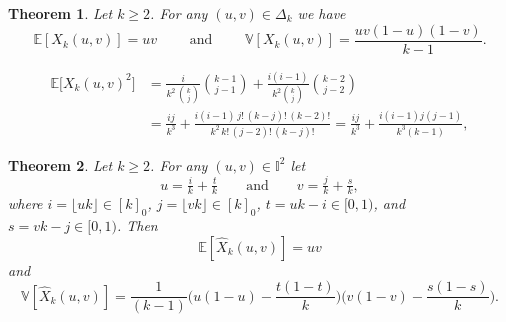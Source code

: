 \documentclass[10pt,a4paper]{amsart}
\newtheorem{theorem}{Theorem}
\newcommand{\DK}{\Delta_k}
\newcommand{\EE}{\mathbb{E}}
\newcommand{\II}{\mathbb{I}}
\newcommand{\VV}{\mathbb{V}}
\newcommand{\Xhat}{\widehat{X}}
\begin{document}
\begin{theorem} \label{th:exk}
    Let $k\ge 2$. For any $(u,v) \in \DK$ we have 
    $$ \EE[X_k(u,v)] = uv \qquad \text{ and } \qquad \VV[X_k(u,v)] = \frac{uv(1-u)(1-v)}{k-1}.$$
\end{theorem}

\begin{align}
    \EE\big[X_k(u,v)^2\big] &= \frac{i}{k^2 \, \binom{k}{j}} \binom{k-1}{j-1} + \frac{i(i-1)}{k^2 \binom{k}{j}} \binom{k-2}{j-2} \label{eq:E(X_k^2)}\\
    &= \frac{ij}{k^3} + \frac{i(i-1) \, j!\, (k-j)! \, (k-2)!}{k^2 \, k! \, (j-2)! \, (k-j)!} = \frac{ij}{k^3} + \frac{i(i-1)j(j-1)}{k^3 (k-1)}, \nonumber
\end{align}

\begin{theorem}\label{th:exk_hat}
    Let $k\ge 2$. For any $(u,v) \in \II^2$ let 
$$u = \tfrac{i}{k} + \tfrac{t}{k} \qquad \text{and} \qquad v = \tfrac{j}{k} + \tfrac{s}{k},$$
where $i=\lfloor uk \rfloor \in [k]_0$, $j=\lfloor vk \rfloor \in[k]_0$, $t = uk -i \in [0,1)$, and $s = vk -j \in [0,1)$. Then 
    $$ \EE[\Xhat_k(u,v)] = uv $$ and $$ \VV[\Xhat_k(u,v)] = \frac{1}{(k-1)}\Big(u(1-u)-\frac{t(1-t)}{k}\Big)\Big(v(1-v)-\frac{s(1-s)}{k}\Big).$$
\end{theorem}
\end{document}
